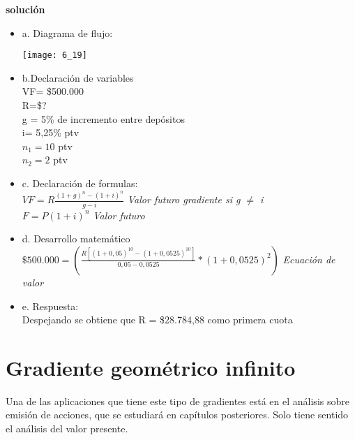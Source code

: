 	\textbf{solución}\\
	\begin{itemize}
		\item a. Diagrama de flujo:\\
		\begin{center}
			\texttt{[image: 6\_19]}
		\end{center}
		\item b.Declaración de variables\\
			VF= \$500.000\\
			R=\$?\\
			g = 5\% de incremento entre depósitos\\
			i= 5,25\% ptv\\
			$n_{1} = 10$ ptv\\
		$	n_{2} = 2$ ptv\\
			
		\item c. Declaración de formulas:\\
		
		$VF = R\frac{(1+g)^n-(1+i)^n}{g-i}$ \hspace{35 pt} \textit{Valor futuro gradiente si g $\not=$ i}\\
		$F = P(1+i)^n$ \hspace{35 pt} \textit{Valor futuro}\\
		\item d. Desarrollo matemático\\
		$\$500.000 = (\frac{R[(1+0,05)^{10}-(1+0,0525)^{10}]}{0,05-0,0525}*(1+0,0525)^2)$ \hspace{35 pt} \textit{Ecuación de valor}\\
		\item e. Respuesta:\\
		Despejando se obtiene que R = \$28.784,88 como primera cuota\\
	\end{itemize}
	
	\section{Gradiente geométrico infinito}
	Una de las aplicaciones que tiene este tipo de gradientes está en el análisis sobre emisión de acciones, que se estudiará en capítulos posteriores. Solo tiene sentido el análisis del valor presente.\\
	
